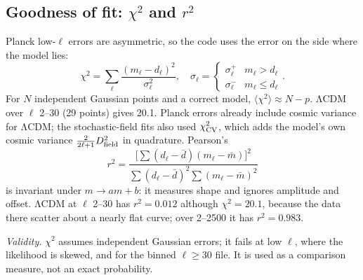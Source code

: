 \documentclass[10pt,twocolumn]{article}
\newcommand{\why}[1]{\par\noindent\textit{Validity.} #1\par}
\begin{document}
\subsection{Goodness of fit: $\chi^2$ and $r^2$}\label{sec:stats}
Planck low-$\ell$ errors are asymmetric, so the code uses the error on the side where the model lies:
\begin{equation}\label{eq:chi2}
\chi^2=\sum_\ell\frac{(m_\ell-d_\ell)^2}{\sigma_\ell^2},\quad\sigma_\ell=\begin{cases}\sigma^+_\ell&m_\ell>d_\ell\\\sigma^-_\ell&m_\ell\le d_\ell\end{cases}.
\end{equation}
For $N$ independent Gaussian points and a correct model, $\langle\chi^2\rangle\approx N-p$. ΛCDM over $\ell$ 2--30 (29 points) gives 20.1. Planck errors already include cosmic variance for ΛCDM; the stochastic-field fits also used $\chi^2_{\rm CV}$, which adds the model's own cosmic variance $\tfrac{2}{2\ell+1}D_{\rm field}^2$ in quadrature. Pearson's
\begin{equation}
r^2=\frac{\big[\sum(d_\ell-\bar d)(m_\ell-\bar m)\big]^2}{\sum(d_\ell-\bar d)^2\sum(m_\ell-\bar m)^2}
\end{equation}
is invariant under $m\to am+b$: it measures shape and ignores amplitude and offset. ΛCDM at $\ell$ 2--30 has $r^2=0.012$ although $\chi^2=20.1$, because the data there scatter about a nearly flat curve; over 2--2500 it has $r^2=0.983$.
\why{$\chi^2$ assumes independent Gaussian errors; it fails at low $\ell$, where the likelihood is skewed, and for the binned $\ell\ge30$ file. It is used as a comparison measure, not an exact probability.}
\end{document}
